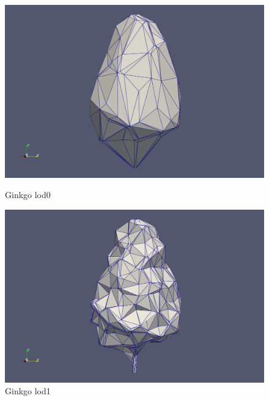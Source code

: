 \documentclass[12pt]{article}
\begin{document}
\begin{figure}[H]
    \centering
    \begin{minipage}{0.45\textwidth}
        \centering
        \includegraphics[width=1\textwidth]{images/gingko_lod0.png}
        \caption{Ginkgo lod0}
    \end{minipage}\hfill
    \begin{minipage}{0.45\textwidth}
        \centering
        \includegraphics[width=1\textwidth]{images/gingko_lod1.png}
        \caption{Ginkgo lod1}
    \end{minipage}
\end{figure}
\end{document}
